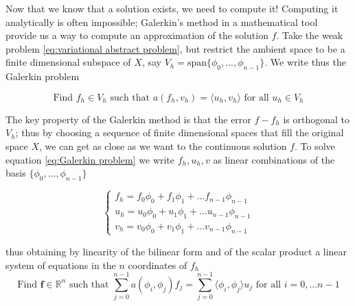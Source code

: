 Now that we know that a solution exists, we need to compute it! Computing it analytically is often impossible; Galerkin's method in a mathematical tool provide us a way to compute an approximation of the solution $f$. Take the weak problem \ref{eq:variational abstract problem}, but restrict the ambient space to be a finite dimensional subspace of $X$, say $V_h = \text{span}\{\phi_0, ..., \phi_{n-1}\}$. We write thus the Galerkin problem
\vspace{0.5cm}

\begin{equation}\label{eq:Galerkin problem}
		\text{Find }f_h\in V_h\text{ such that } a(f_h, v_h)=\langle u_h, v_h\rangle \text{ for all } u_h \in V_h
\end{equation}
\vspace{0.5cm}

The key property of the Galerkin method is that the error $f-f_h$ is orthogonal to $V_h$; thus by choosing a sequence of finite dimensional spaces that fill the original space $X$, we can get as close as we want to the continuous solution $f$.
To solve equation \ref{eq:Galerkin problem} we write $f_h, u_h, v$ as linear combinations of the basis $\{\phi_0, ..., \phi_{n-1}\}$

$$\begin{cases}
f_h = f_0\phi_0 +  f_1\phi_1 + ...  f_{n-1}\phi_{n-1}\\
u_h = u_0\phi_0 +  u_1\phi_1 + ...  u_{n-1}\phi_{n-1}\\
v_h = v_0\phi_0 +  v_1\phi_1 + ...  v_{n-1}\phi_{n-1}
\end{cases}
$$

 thus obtaining by linearity of the bilinear form and of the scalar product a linear system of equations in the $n$ coordinates of $f_h$
\begin{equation}\label{eq:Galerkin problem in the basis functions}
\text{Find }\mathbf f\in\mathbb R^n\text{ such that } \sum_{j=0}^{n-1}a(\phi_i, \phi_j)f_j=\sum_{j=0}^{n-1}\langle \phi_i, \phi_j\rangle u_j \text{ for all } i=0, ... n-1
\end{equation}

